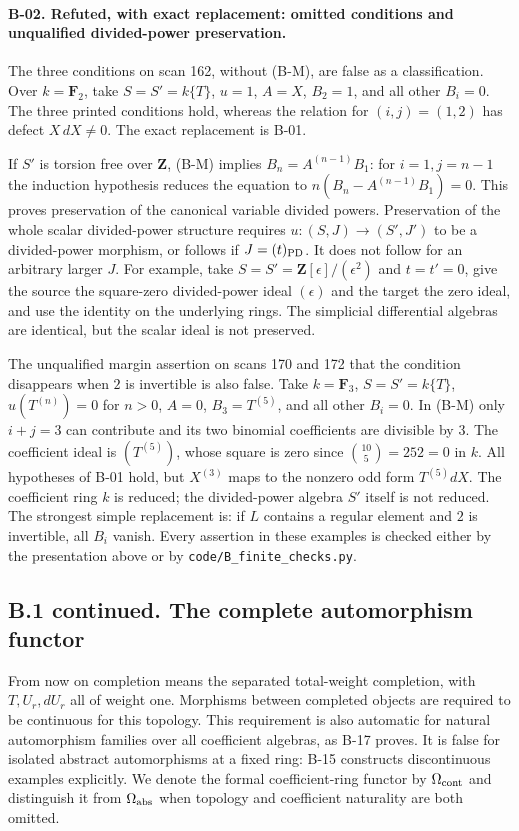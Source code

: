 \paragraph{B-02. Refuted, with exact replacement: omitted conditions and
unqualified divided-power preservation.}
The three conditions on scan 162, without (B-M), are false as a
classification. Over $k=\mathbf F_2$, take $S=S'=k\{T\}$, $u=1$,
$A=X$, $B_2=1$, and all other $B_i=0$. The three printed conditions
hold, whereas the relation for $(i,j)=(1,2)$ has defect $X\,dX\ne0$.
The exact replacement is B-01.

If $S'$ is torsion free over $\mathbf Z$, (B-M) implies
$B_n=A^{(n-1)}B_1$: for $i=1,j=n-1$ the induction hypothesis reduces
the equation to $n(B_n-A^{(n-1)}B_1)=0$.
This proves preservation of the canonical variable divided powers.
Preservation of the whole scalar divided-power structure requires
$u:(S,J)\to(S',J')$ to be a divided-power morphism, or follows if
$J=(t)_{\rm PD}$. It does not follow for an arbitrary larger $J$.
For example, take $S=S'=\mathbf Z[\epsilon]/(\epsilon^2)$ and
$t=t'=0$, give the source the square-zero divided-power ideal
$(\epsilon)$ and the target the zero ideal, and use the identity on
the underlying rings. The simplicial differential algebras are
identical, but the scalar ideal is not preserved.

The unqualified margin assertion on scans 170 and 172 that the
condition disappears when $2$ is invertible is also false. Take
$k=\mathbf F_3$, $S=S'=k\{T\}$, $u(T^{(n)})=0$ for $n>0$,
$A=0$, $B_3=T^{(5)}$, and all other $B_i=0$.
In (B-M) only $i+j=3$ can contribute and its two binomial coefficients
are divisible by $3$. The coefficient ideal is $(T^{(5)})$, whose
square is zero since $\binom{10}{5}=252=0$ in $k$.
All hypotheses of B-01 hold, but $X^{(3)}$ maps to the nonzero odd
form $T^{(5)}dX$. The coefficient ring $k$ is reduced; the divided-power
algebra $S'$ itself is not reduced. The strongest simple replacement
is: if $L$ contains a regular element and $2$ is invertible, all $B_i$
vanish. Every assertion in these examples is checked either by the
presentation above or by \texttt{code/B\_finite\_checks.py}.

\subsection{B.1 continued. The complete automorphism functor}

From now on completion means the separated total-weight completion,
with $T,U_r,dU_r$ all of weight one. Morphisms between completed
objects are required to be continuous for this topology. This
requirement is also automatic for natural automorphism families
over all coefficient algebras, as B-17 proves. It is false for
isolated abstract automorphisms at a fixed ring: B-15 constructs
discontinuous examples explicitly. We denote the formal
coefficient-ring functor by $\Omega_{\rm cont}$ and distinguish it
from $\Omega_{\rm abs}$ when topology and coefficient naturality
are both omitted.

